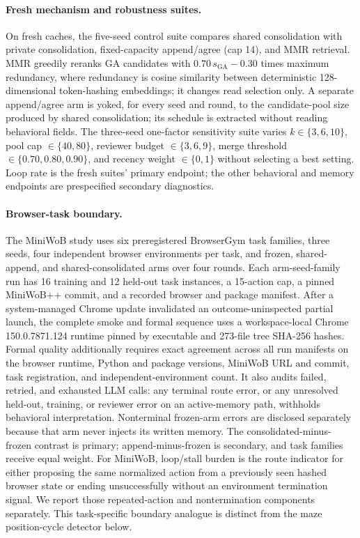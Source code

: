 \documentclass[letterpaper]{article} %
\begin{document}
\paragraph{Fresh mechanism and robustness suites.}
On fresh caches, the five-seed control suite compares shared consolidation with
private consolidation, fixed-capacity append/agree (cap 14), and MMR retrieval. MMR
greedily reranks GA candidates with $0.70\,s_{\mathrm{GA}}-0.30$ times maximum
redundancy, where redundancy is cosine similarity between deterministic
128-dimensional token-hashing embeddings; it changes read selection only. A separate
append/agree arm is yoked, for every seed and round, to the candidate-pool size produced by
shared consolidation; its schedule is extracted without reading behavioral fields.
The three-seed one-factor sensitivity suite varies
$k\in\{3,6,10\}$, pool cap $\in\{40,80\}$, reviewer budget
$\in\{3,6,9\}$, merge threshold $\in\{0.70,0.80,0.90\}$, and recency
weight $\in\{0,1\}$ without selecting a best setting.
Loop rate is the fresh suites' primary endpoint; the other behavioral and memory endpoints
are prespecified secondary diagnostics.

\paragraph{Browser-task boundary.}
The MiniWoB study uses six preregistered BrowserGym task families, three seeds, four
independent browser environments per task, and frozen, shared-append, and
shared-consolidated arms over four rounds. Each arm-seed-family run has 16 training and
12 held-out task instances, a 15-action cap, a pinned MiniWoB++ commit, and a recorded
browser and package manifest. After a system-managed Chrome update invalidated an
outcome-uninspected partial launch, the complete smoke and formal sequence uses a workspace-local Chrome
150.0.7871.124 runtime pinned by executable and 273-file tree SHA-256 hashes. Formal
quality additionally requires exact agreement across all run manifests on the browser
runtime, Python and package versions, MiniWoB URL and commit, task registration, and
independent-environment count. It also audits failed, retried, and exhausted LLM calls:
any terminal route error, or any unresolved held-out, training, or reviewer error on an
active-memory path, withholds behavioral interpretation. Nonterminal frozen-arm errors are
disclosed separately because that arm never injects its written memory. The
consolidated-minus-frozen contrast is primary;
append-minus-frozen is secondary, and task families receive equal weight.
For MiniWoB, loop/stall burden is the route indicator for either proposing the same
normalized action from a previously seen hashed browser state or ending unsuccessfully
without an environment termination signal. We report those repeated-action and
nontermination components separately. This task-specific boundary analogue is distinct
from the maze position-cycle detector below.
\end{document}
